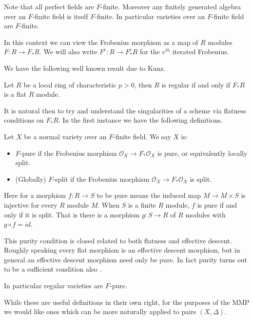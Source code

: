 \documentclass[a4paper,12pt]{book}
\newcommand{\ox}[1][X]{\mathcal{O}_{#1}}
\begin{document}
Note that all perfect fields are $F$-finite. Moreover any finitely generated algebra over an $F$-finite field is itself $F$-finite. In particular varieties over an $F$-finite field are $F$-finite.

In this context we can view the Frobenius morphism as a map of $R$ modules $F:R \to F_{*}R$. We will also write $F^{e}:R \to F_{*}^{e}R$ for the $e^{th}$ iterated Frobenius.

We have the following well known result due to Kunz.

\begin{theorem}\cite{}
	Let $R$ be a local ring of characteristic $p> 0$, then $R$ is regular if and only if $F_{*}R$ is a flat $R$ module.
\end{theorem}

It is natural then to try and understand the singularities of a scheme via flatness conditions on $F_{*}R$. In the first instance we have the following definitions.

\begin{definition}
	Let $X$ be a normal variety over an $F$-finite field.
	We say $X$ is:
	\begin{itemize}
		\item $F$-pure if the Frobenius morphism $\ox \to F_{*}\ox$ is pure, or equivalently locally split.
		\item (Globally) $F$-split if the Frobenius morphism $\ox \to F_{*}\ox$ is split.
	\end{itemize} 
\end{definition}

Here for a morphism $f:R \to S$ to be pure means the induced map $M \to M \times S$ is injective for every $R$ module $M$. When $S$ is a finite $R$ module, $f$ is pure if and only if it is split. That is there is a morphism $g:S \to R$ of $R$ modules with $g \circ f =id$.

\begin{remark}

	This purity condition is closed related to both flatness and effective descent. Roughly speaking every flat morphism is an effective descent morphism, but in general an effective descent morphism need only be pure. In fact purity turns out to be a sufficient condition also \cite[Tag 08WE]{stacks-project}.
	
	In particular regular varieties are $F$-pure.
	
	\end{remark}

While these are useful definitions in their own right, for the purposes of the MMP we would like ones which can be more naturally applied to pairs $(X,\Delta)$.
\end{document}
